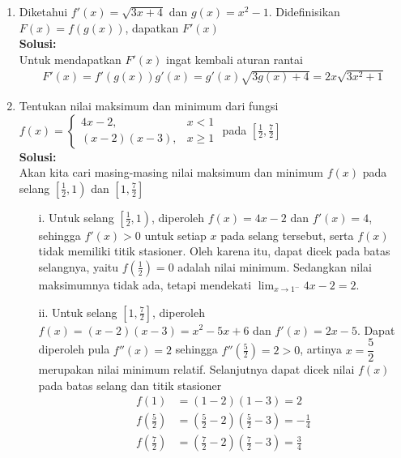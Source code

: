\documentclass{article}
\begin{document}
\begin{enumerate}
\begin{enumerate}
\begin{enumerate}
		\end{enumerate}
		Jadi terdapat dua titik $(x_0,y_0)$ pada kurva $f(x)$ yang garis singgungnya tegak lurus dengan garis $y=x$, yaitu titik $(-3,0)$ dengan garis singgung $x+y+3=0$ dan titik $(-1,2)$ dengan garis singgung $x+y-1=0$
	\end{enumerate}
	\newpage 
	\item Diketahui $f'(x)=\sqrt{3x+4}$ dan $g(x)=x^2-1$. Didefinisikan $F(x)=f(g(x))$, dapatkan $F'(x)$\\
	\textbf{Solusi:}\\
	Untuk mendapatkan $F'(x)$ ingat kembali aturan rantai
	\begin{align*}
	F'(x) =f'(g(x))g'(x) = g'(x)\sqrt{3g(x)+4} = 2x\sqrt{3x^2+1}
	\end{align*}
	\item Tentukan nilai maksimum dan minimum dari fungsi $f(x)=\begin{cases} 4x-2, &x<1 \\
	(x-2)(x-3), &x\geq 1\end{cases}$ pada $\left[\frac{1}{2},\frac{7}{2}\right]$
	\\[0.1 cm] \textbf{Solusi:}\\
	Akan kita cari masing-masing nilai maksimum dan minimum $f(x)$ pada selang $\left[\frac{1}{2},1\right)$ dan $\left[1,\frac{7}{2}\right]$
	\begin{enumerate}
		\item[i.] Untuk selang $\left[\frac{1}{2},1\right)$, diperoleh $f(x)=4x-2$ dan $f'(x)=4$, sehingga $f'(x)>0$ untuk setiap $x$ pada selang tersebut, serta $f(x)$ tidak memiliki titik stasioner. Oleh karena itu, dapat dicek pada batas selangnya, yaitu $f\left(\frac{1}{2}\right)=0$ adalah nilai minimum. Sedangkan nilai maksimumnya tidak ada, tetapi mendekati $\displaystyle \lim_{x\rightarrow 1^-} 4x-2 = 2$.
		\item[ii.] Untuk selang $\left[1,\frac{7}{2}\right]$, diperoleh $f(x)=(x-2)(x-3)=x^2-5x+6$ dan $f'(x)=2x-5$. Dapat diperoleh pula $f''(x)=2$ sehingga $f''\left(\frac{5}{2}\right)=2>0$, artinya $x=\dfrac{5}{2}$ merupakan nilai minimum relatif. Selanjutnya dapat dicek nilai $f(x)$ pada batas selang dan titik stasioner 
		\begin{align*}
		f(1)&=(1-2)(1-3)=2 \\
		f\left(\frac{5}{2}\right) &=\left(\frac{5}{2}-2\right)\left(\frac{5}{2}-3\right) = -\frac{1}{4} \\
		f\left(\frac{7}{2}\right) &= \left(\frac{7}{2}-2\right)\left(\frac{7}{2}-3\right) = \frac{3}{4}

\end{align*}
\end{enumerate}
\end{enumerate}
\end{document}
